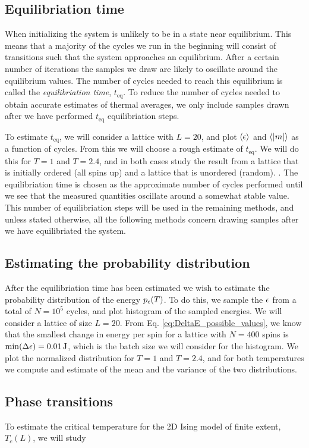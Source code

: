 \subsection{Equilibriation time}\label{subsec_methods:equilibriation_time}
When initializing the system is unlikely to be in a state near equilibrium. This means that a majority of the cycles we run in the beginning will consist of transitions such that the system approaches an equilibrium. After a certain number of iterations the samples we draw are likely to oscillate around the equilibrium values. The number of cycles needed to reach this equilibrium is called the \textit{equilibriation time}, $t_\mathrm{eq}$. To reduce the number of cycles needed to obtain accurate estimates of thermal averages, we only include samples drawn after we have performed $t_\mathrm{eq}$ equilibriation steps. 

To estimate $t_\mathrm{eq}$, we will consider a lattice with $L=20$, and plot $\expval{\epsilon}$ and $\expval{\abs{m}}$ as a function of cycles. From this we will choose a rough estimate of $t_\mathrm{eq}$. We will do this for $T=1$ and $T=2.4$, and in both cases study the result from a lattice that is initially ordered (all spins up) and a lattice that is unordered (random). . The equilibriation time is chosen as the approximate number of cycles performed until we see that the measured quantities oscillate around a somewhat stable value. This number of equilibriation steps will be used in the remaining methods, and unless stated otherwise, all the following methods concern drawing samples after we have equilibriated the system.     



\subsection{Estimating the probability distribution}\label{subsec_methods:histogram}
After the equilibriation time has been estimated we wish to estimate the probability distribution of the energy $p_\epsilon(T)$. To do this, we sample the $\epsilon$ from a total of $N=10^5$ cycles, and plot histogram of the sampled energies. We will consider a lattice of size $L=20$. From Eq. \eqref{eq:DeltaE_possible_values}, we know that the smallest change in energy per spin for a lattice with $N=400$ spins is $\min(\Delta\epsilon)=0.01\,\mathrm{J}$, which is the batch size we will consider for the histogram. We plot the normalized distribution for $T=1$ and $T=2.4$, and for both temperatures we compute and estimate of the mean and the variance of the two distributions.     


\subsection{Phase transitions}\label{subsec_methods:PT}
To estimate the critical temperature for the 2D Ising model of finite extent, $T_c(L)$, we will study  
